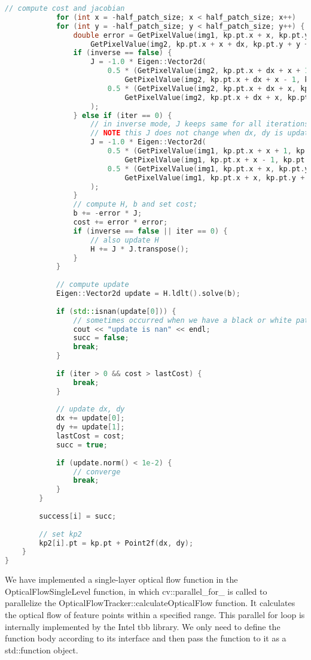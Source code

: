 \begin{lstlisting}[language=c++,caption=slambook2/ch8/optical_flow.cpp (part))]
			// compute cost and jacobian
			for (int x = -half_patch_size; x < half_patch_size; x++)
			for (int y = -half_patch_size; y < half_patch_size; y++) {
				double error = GetPixelValue(img1, kp.pt.x + x, kp.pt.y + y) -
					GetPixelValue(img2, kp.pt.x + x + dx, kp.pt.y + y + dy);;  // Jacobian
				if (inverse == false) {
					J = -1.0 * Eigen::Vector2d(
						0.5 * (GetPixelValue(img2, kp.pt.x + dx + x + 1, kp.pt.y + dy + y) -
							GetPixelValue(img2, kp.pt.x + dx + x - 1, kp.pt.y + dy + y)),
						0.5 * (GetPixelValue(img2, kp.pt.x + dx + x, kp.pt.y + dy + y + 1) -
							GetPixelValue(img2, kp.pt.x + dx + x, kp.pt.y + dy + y - 1))
					);
				} else if (iter == 0) {
					// in inverse mode, J keeps same for all iterations
					// NOTE this J does not change when dx, dy is updated, so we can store it and only compute error
					J = -1.0 * Eigen::Vector2d(
						0.5 * (GetPixelValue(img1, kp.pt.x + x + 1, kp.pt.y + y) -
							GetPixelValue(img1, kp.pt.x + x - 1, kp.pt.y + y)),
						0.5 * (GetPixelValue(img1, kp.pt.x + x, kp.pt.y + y + 1) -
							GetPixelValue(img1, kp.pt.x + x, kp.pt.y + y - 1))
					);
				}
				// compute H, b and set cost;
				b += -error * J;
				cost += error * error;
				if (inverse == false || iter == 0) {
					// also update H
					H += J * J.transpose();
				}
			}
			
			// compute update
			Eigen::Vector2d update = H.ldlt().solve(b);
			
			if (std::isnan(update[0])) {
				// sometimes occurred when we have a black or white patch and H is irreversible
				cout << "update is nan" << endl;
				succ = false;
				break;
			}
			
			if (iter > 0 && cost > lastCost) {
				break;
			}
			
			// update dx, dy
			dx += update[0];
			dy += update[1];
			lastCost = cost;
			succ = true;
			
			if (update.norm() < 1e-2) {
				// converge
				break;
			}
		}
		
		success[i] = succ;
		
		// set kp2
		kp2[i].pt = kp.pt + Point2f(dx, dy);
	}
}
\end{lstlisting}

We have implemented a single-layer optical flow function in the OpticalFlowSingleLevel function, in which cv::parallel\_for\_ is called to parallelize the OpticalFlowTracker::calculateOpticalFlow function. It calculates the optical flow of feature points within a specified range. This parallel for loop is internally implemented by the Intel tbb library. We only need to define the function body according to its interface and then pass the function to it as a std::function object.

